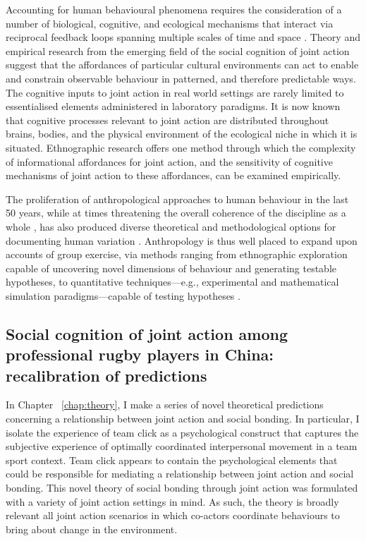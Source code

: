 \begin{CJK}{UTF8}{gbsn}
Accounting for human behavioural phenomena requires the consideration of a number of biological, cognitive, and ecological mechanisms that interact via reciprocal feedback loops spanning multiple scales of time and space \citep{Fuentes2015}.  Theory and empirical research from the emerging field of the social cognition of joint action suggest that the affordances of particular cultural environments can act to enable and constrain observable behaviour in patterned, and therefore predictable ways.  The cognitive inputs to joint action in real world settings are rarely limited to essentialised elements administered in laboratory paradigms.  It is now known that cognitive processes relevant to joint action are distributed throughout brains, bodies, and the physical environment of the ecological niche in which it is situated.  Ethnographic research offers one method through which the complexity of informational affordances for joint action, and the sensitivity of cognitive mechanisms of joint action to these affordances, can be examined empirically.

The proliferation of anthropological approaches to human behaviour in the last 50 years, while at times threatening the overall coherence of the discipline as a whole \citep{Beller2012}, has also produced diverse theoretical and methodological options for documenting human variation \citep{Fuentes2016a}.  Anthropology is thus well placed to expand upon accounts of group exercise, via methods ranging from ethnographic exploration capable of uncovering novel dimensions of behaviour and generating testable hypotheses, to quantitative techniques---e.g., experimental and mathematical simulation paradigms---capable of testing hypotheses \citep{Epstein2006,Fuentes2016}.


\subsection{Social cognition of joint action among professional rugby players in China: recalibration of predictions}

In Chapter ~\ref{chap:theory}, I make a series of novel theoretical predictions concerning a relationship between joint action and social bonding. In particular, I isolate the experience of team click as a psychological construct that captures the subjective experience of optimally coordinated interpersonal movement in a team sport context.  Team click appears to contain the psychological elements that could be responsible for mediating a relationship between joint action and social bonding.  This novel theory of social bonding through joint action was formulated with a variety of joint action settings in mind. As such, the theory is broadly relevant all joint action scenarios in which co-actors coordinate behaviours to bring about change in the environment.


\end{CJK}
